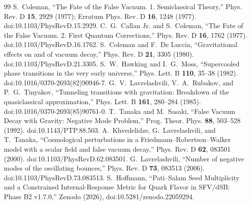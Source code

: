 \documentclass[11pt]{article}
\begin{document}
\begin{thebibliography}{99}
 S.~Coleman, ``The Fate of the False Vacuum. 1. Semiclassical Theory,'' Phys. Rev. D \textbf{15}, 2929 (1977); Erratum Phys. Rev. D \textbf{16}, 1248 (1977). doi:10.1103/PhysRevD.15.2929.
 C.~G.~Callan Jr. and S.~Coleman, ``The Fate of the False Vacuum. 2. First Quantum Corrections,'' Phys. Rev. D \textbf{16}, 1762 (1977). doi:10.1103/PhysRevD.16.1762.
 S.~Coleman and F.~De Luccia, ``Gravitational effects on and of vacuum decay,'' Phys. Rev. D \textbf{21}, 3305 (1980). doi:10.1103/PhysRevD.21.3305.
 S.~W.~Hawking and I.~G.~Moss, ``Supercooled phase transitions in the very early universe,'' Phys. Lett. B \textbf{110}, 35--38 (1982). doi:10.1016/0370-2693(82)90946-7.
 G.~V.~Lavrelashvili, V.~A.~Rubakov, and P.~G.~Tinyakov, ``Tunneling transitions with gravitation: Breakdown of the quasiclassical approximation,'' Phys. Lett. B \textbf{161}, 280--284 (1985). doi:10.1016/0370-2693(85)90761-0.
 T.~Tanaka and M.~Sasaki, ``False Vacuum Decay with Gravity: Negative Mode Problem,'' Prog. Theor. Phys. \textbf{88}, 503--528 (1992). doi:10.1143/PTP.88.503.
 A.~Khvedelidze, G.~Lavrelashvili, and T.~Tanaka, ``Cosmological perturbations in a Friedmann--Robertson--Walker model with a scalar field and false vacuum decay,'' Phys. Rev. D \textbf{62}, 083501 (2000). doi:10.1103/PhysRevD.62.083501.
 G.~Lavrelashvili, ``Number of negative modes of the oscillating bounces,'' Phys. Rev. D \textbf{73}, 083513 (2006). doi:10.1103/PhysRevD.73.083513.
 S.~Hoffmann, ``Pati--Salam Seed Multiplicity and a Constrained Internal-Response Metric for Quark Flavor in SFV/dSB: Phase B2 v1.7.0,'' Zenodo (2026), doi:10.5281/zenodo.22059294.
\end{thebibliography}
\end{document}
